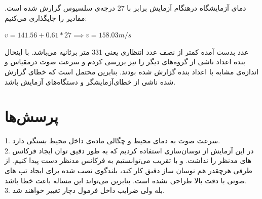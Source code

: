 \documentclass{article}
\begin{document}
دمای آزمایشگاه درهنگام آزمایش برابر با 27 درجه‌ی سلسیوس گزارش شده است. مقادیر را جایگذاری می‌کنیم:
\begin{center}
$v = 141.56 + 0.61*27 \implies v = 158.03 m/s$
\end{center}

عدد بدست آمده کمتر از نصف عدد انتظاری یعنی 331 متر برثانیه می‌باشد. با اینحال بنده اعداد ناشی از گروه‌های دیگر را نیز بررسی  کردم و سرعت صوت درمقیاس و اندازه‌ی مشابه با اعداد بنده گزارش شده بودند. بنابرین محتمل است که خطای گزارش شده ناشی از خطای‌آزمایشگر و دستگاه‌های آزمایش باشد.




\section{پرسش‌ها}

1. سرعت صوت به دمای محیط و چگالی ماده‌ی داخل محیط بستگی دارد. \\
2. در این آزمایش از نوسان‌سازی استفاده کردیم که به طور دقیق توان ایجاد فرکانس های مدنظر را نداشت. و با تقریب می‌توانستیم به فرکانس مدنظر دست پیدا کنیم. از طرفی هرچقدر هم نوسان ساز دقیق کار کند، بلندگوی نصب شده برای ایجاد تپ های صوتی با دقت بالا طراحی نشده است. بنابرین می‌تواند این مساله باعث خطا باشد. \\
3. بله ولی ضرایب داخل فرمول دچار تغییر خواهند شد.
\end{document}
